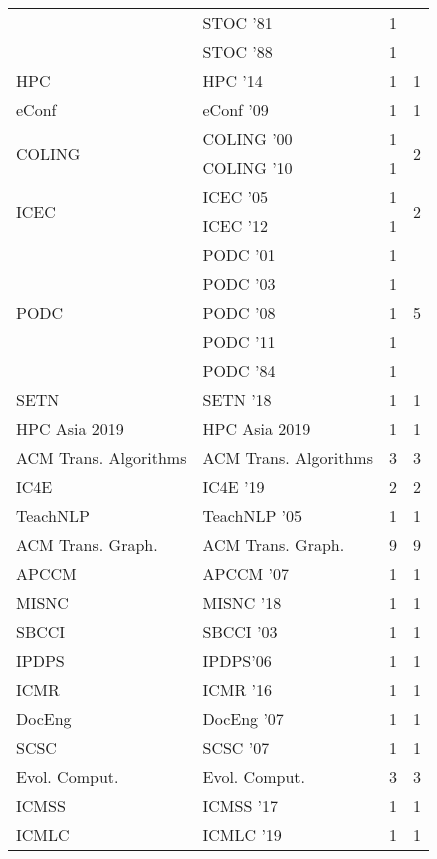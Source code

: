 \begin{table*}[t]
\begin{tabular}{llrr}
& STOC '81 & 1 &\\
& STOC '88 & 1 &\\
\multirow{1}{*}{HPC } & HPC '14 & 1 & \multirow{1}{*}{1}\\
\multirow{1}{*}{eConf } & eConf '09 & 1 & \multirow{1}{*}{1}\\
\multirow{2}{*}{COLING } & COLING '00 & 1 & \multirow{2}{*}{2}\\
& COLING '10 & 1 &\\
\multirow{2}{*}{ICEC } & ICEC '05 & 1 & \multirow{2}{*}{2}\\
& ICEC '12 & 1 &\\
\multirow{5}{*}{PODC } & PODC '01 & 1 & \multirow{5}{*}{5}\\
& PODC '03 & 1 &\\
& PODC '08 & 1 &\\
& PODC '11 & 1 &\\
& PODC '84 & 1 &\\
\multirow{1}{*}{SETN } & SETN '18 & 1 & \multirow{1}{*}{1}\\
\multirow{1}{*}{HPC Asia 2019} & HPC Asia 2019 & 1 & \multirow{1}{*}{1}\\
\multirow{1}{*}{ACM Trans. Algorithms} & ACM Trans. Algorithms & 3 & \multirow{1}{*}{3}\\
\multirow{1}{*}{IC4E } & IC4E '19 & 2 & \multirow{1}{*}{2}\\
\multirow{1}{*}{TeachNLP } & TeachNLP '05 & 1 & \multirow{1}{*}{1}\\
\multirow{1}{*}{ACM Trans. Graph.} & ACM Trans. Graph. & 9 & \multirow{1}{*}{9}\\
\multirow{1}{*}{APCCM } & APCCM '07 & 1 & \multirow{1}{*}{1}\\
\multirow{1}{*}{MISNC } & MISNC '18 & 1 & \multirow{1}{*}{1}\\
\multirow{1}{*}{SBCCI } & SBCCI '03 & 1 & \multirow{1}{*}{1}\\
\multirow{1}{*}{IPDPS} & IPDPS'06 & 1 & \multirow{1}{*}{1}\\
\multirow{1}{*}{ICMR } & ICMR '16 & 1 & \multirow{1}{*}{1}\\
\multirow{1}{*}{DocEng } & DocEng '07 & 1 & \multirow{1}{*}{1}\\
\multirow{1}{*}{SCSC } & SCSC '07 & 1 & \multirow{1}{*}{1}\\
\multirow{1}{*}{Evol. Comput.} & Evol. Comput. & 3 & \multirow{1}{*}{3}\\
\multirow{1}{*}{ICMSS } & ICMSS '17 & 1 & \multirow{1}{*}{1}\\
\multirow{1}{*}{ICMLC } & ICMLC '19 & 1 & \multirow{1}{*}{1}\\

\end{tabular}
\end{table*}
